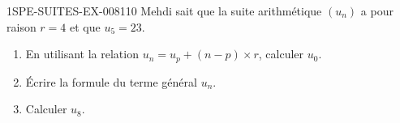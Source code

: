 \begin{exercice}{1SPE-SUITES-EX-008}{1}{10}
Mehdi sait que la suite arithmétique $(u_n)$ a pour raison $r = 4$ et que $u_5 = 23$.
\begin{enumerate}
  \item En utilisant la relation $u_n = u_p + (n-p) \times r$, calculer $u_0$.
  \item Écrire la formule du terme général $u_n$.
  \item Calculer $u_8$.
\end{enumerate}
\end{exercice}
